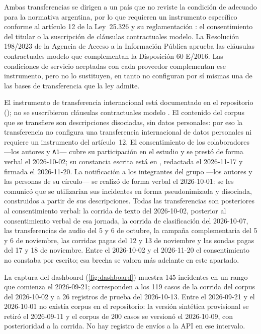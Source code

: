 Ambas transferencias se dirigen a un país que no reviste la condición de adecuado para la normativa argentina, por lo que requieren un instrumento específico conforme al artículo 12 de la Ley~25.326 y su reglamentación \parencite{Decreto1558_2001,DNPDP2016_disposicion60,AAIP2023_resolucion198}: el consentimiento del titular o la suscripción de cláusulas contractuales modelo. La Resolución 198/2023 de la Agencia de Acceso a la Información Pública aprueba las cláusulas contractuales modelo que complementan la Disposición 60-E/2016. Las condiciones de servicio aceptadas con cada proveedor complementan ese instrumento, pero no lo sustituyen, en tanto no configuran por sí mismas una de las bases de transferencia que la ley admite.

El instrumento de transferencia internacional está documentado en el repositorio (); no se suscribieron cláusulas contractuales modelo \parencite{DNPDP2016_disposicion60,AAIP2023_resolucion198}. El contenido del corpus que se transfiere son descripciones disociadas, sin datos personales: por eso la transferencia no configura una transferencia internacional de datos personales ni requiere un instrumento del artículo~12. El consentimiento de los colaboradores ---los autores y \texttt{A1}--- cubre su participación en el estudio y se prestó de forma verbal el 2026-10-02; su constancia escrita está en , redactada el 2026-11-17 y firmada el 2026-11-20. La notificación a los integrantes del grupo ---los autores y las personas de su círculo--- se realizó de forma verbal el 2026-10-01: se les comunicó que se utilizarían sus incidentes en forma pseudonimizada y disociada, construidos a partir de sus descripciones. Todas las transferencias son posteriores al consentimiento verbal: la corrida de texto del 2026-10-02, posterior al consentimiento verbal de esa jornada, la corrida de clasificación del 2026-10-07, las transferencias de audio del 5 y 6 de octubre, la campaña complementaria del 5 y 6 de noviembre, las corridas pagas del 12 y 13 de noviembre y las sondas pagas del 17 y 18 de noviembre. Entre el 2026-10-02 y el 2026-11-20 el consentimiento no constaba por escrito; esa brecha se valora más adelante en este apartado.

La captura del dashboard (\autoref{fig:dashboard}) muestra 145 incidentes en un rango que comienza el 2026-09-21; corresponden a los 119 casos de la corrida del corpus del 2026-10-02 y a 26 registros de prueba del 2026-10-13. Entre el 2026-09-21 y el 2026-10-01 no existía corpus en el repositorio: la versión sintética provisional se retiró el 2026-09-11 y el corpus de 200 casos se versionó el 2026-10-09, con posterioridad a la corrida. No hay registro de envíos a la API en ese intervalo.

